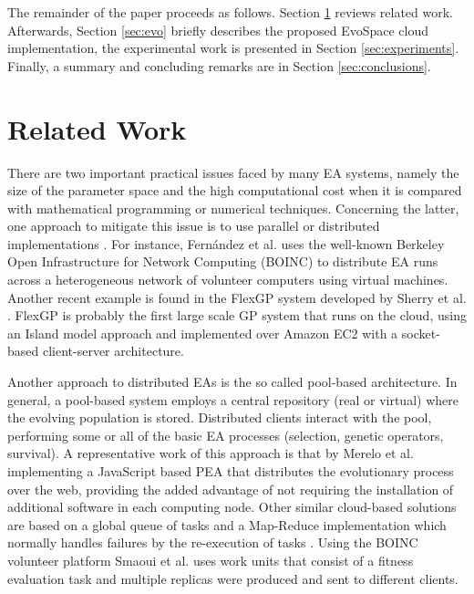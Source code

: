 \documentclass{llncs}
\begin{document}
The remainder of the paper proceeds as follows.  Section \ref{sec:work} 
reviews related work. Afterwards, Section \ref{sec:evo} briefly describes the
proposed EvoSpace cloud implementation, the experimental work is presented in 
Section \ref{sec:experiments}. Finally, a summary and concluding remarks are in
Section \ref{sec:conclusions}.

\section{Related Work}
\label{sec:work}
There are two important practical issues faced by many EA systems, namely the size of the parameter 
space and the high computational cost when it is compared with mathematical programming or numerical techniques.
Concerning the latter, one approach to mitigate this issue is to use parallel or 
distributed implementations \cite{cantu-paz:migration-policies,duda2013gpu}.
For instance, Fern\'andez et al. \cite{nc}%
uses the well-known Berkeley Open Infrastructure for Network Computing (BOINC) to distribute EA runs across a
heterogeneous network of volunteer computers using virtual machines. Another recent example is 
found in the FlexGP system developed by Sherry et al. \cite{sherry2012flex}. FlexGP is probably the first large scale GP system 
that runs on the cloud, using an Island model approach and implemented over Amazon EC2 with a 
socket-based client-server architecture.

Another approach to distributed EAs is the so called pool-based architecture. In general, a 
pool-based system employs a central repository (real or virtual) where the evolving population is stored.
Distributed clients interact with the pool, performing some or all of the basic EA processes 
(selection, genetic operators, survival). A representative work of this approach 
is that by Merelo et al. \cite{agajaj} implementing a JavaScript based PEA that distributes 
the evolutionary process over the web, providing the added advantage of not requiring the 
installation of additional software in each computing node.  Other similar cloud-based solutions 
are based on a global queue of tasks and a Map-Reduce implementation which normally handles failures 
by the re-execution of  tasks \cite{fazenda2012,di2013towards,FlexGP}. Using the BOINC 
volunteer platform  Smaoui et al. \cite{FekiNG09} uses work units that consist of a fitness 
evaluation task and multiple replicas  were produced and sent to different clients.
\end{document}
